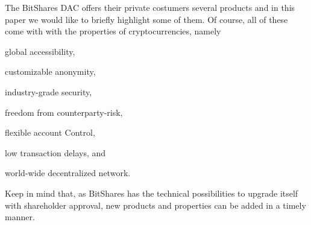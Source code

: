 The BitShares DAC offers their private costumers several products and in this
paper we would like to briefly highlight some of them. Of course, all of these
come with with the properties of cryptocurrencies, namely
\begin{inparaenum}[(a)]
 \item global accessibility,
 \item customizable anonymity,
 \item industry-grade security,
 \item freedom from counterparty-risk,
 \item flexible account Control,
 \item low transaction delays, and
 \item world-wide decentralized network.
\end{inparaenum}

Keep in mind that, as BitShares has the technical possibilities to upgrade
itself with shareholder approval, new products and properties can be added in a
timely manner.
